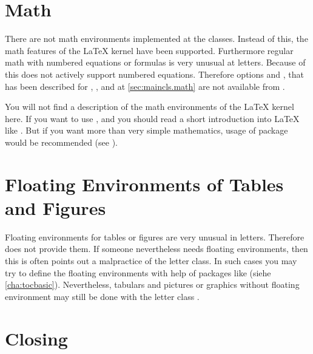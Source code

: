\section{Math}
%
\BeginIndexGroup
{}%
%
%

There are not math environments implemented at the \KOMAScript{}
classes. Instead of this, the math features of the \LaTeX{} kernel have been
supported. Furthermore regular math with numbered
equations or formulas is very unusual at letters. Because of this
 does not actively support numbered equations. Therefore
options  and , that has been described for
, , and  at
\autoref{sec:maincls.math} are not available from .

You will not find a description of the math environments of the \LaTeX{} kernel
here. If you want to use ,
 and
 you should read a short introduction
into \LaTeX{} like \cite{lshort}. But if you want more than
very simple mathematics, usage of package  would be
recommended (see \cite{package:amsmath}).%
%
\EndIndexGroup


\section{Floating Environments of Tables and Figures}

Floating environments for tables or figures are very unusual in
letters. Therefore  does not provide
them. If someone nevertheless needs floating environments, then this is often
points out a malpractice of the letter class. In such cases you may try to
define the floating environments with help of packages like  (siehe
\autoref{cha:tocbasic}). Nevertheless, tabulars and pictures or graphics
without floating environment may still be done with the letter class
.




\section{Closing}
\BeginIndexGroup%
%
%
%
%

